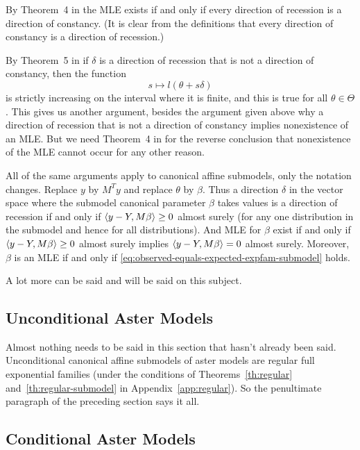 By Theorem~{4} in \citet{geyer-gdor} the MLE exists if and only if
every direction of recession is a direction of constancy.
(It is clear from the definitions that every direction of constancy is
a direction of recession.)

By Theorem~{5} in \citet{geyer-gdor} if $\delta$ is a direction of recession
that is not a direction of constancy, then the function
$$
   s \mapsto l(\theta + s \delta)
$$
is strictly increasing on the interval where it is finite, and this is
true for all $\theta \in \Theta$.  This gives us another argument,
besides the argument given above why a direction of recession that is
not a direction of constancy implies nonexistence of an MLE.
But we need Theorem~{4} in \citet{geyer-gdor} for the reverse conclusion
that nonexistence of the MLE cannot occur for any other reason.

All of the same arguments apply to canonical affine submodels,
only the notation changes.  Replace $y$ by $M^T y$ and replace $\theta$ by
$\beta$.  Thus a direction $\delta$ in the vector space where the submodel
canonical parameter $\beta$ takes values is a direction of recession if and
only if $\langle y - Y, M \beta \rangle \ge 0$ almost surely (for any one distribution
in the submodel and hence for all distributions).  And MLE for $\beta$ exist
if and only if $\langle y - Y, M \beta \rangle \ge 0$ almost surely
implies $\langle y - Y, M \beta \rangle = 0$ almost surely.
Moreover, $\beta$ is an MLE if and only if
\eqref{eq:observed-equals-expected-expfam-submodel} holds.

A lot more can be said and will be said on this subject.

\subsection{Unconditional Aster Models}

Almost nothing needs to be said in this section that hasn't already been said.
Unconditional canonical affine submodels of aster models are regular full
exponential families (under the conditions of Theorems~\ref{th:regular}
and~\ref{th:regular-submodel} in Appendix~\ref{app:regular}).  So the
penultimate paragraph of the preceding section says it all.

\subsection{Conditional Aster Models}
\label{sec:conditional-aster-model-mle}

